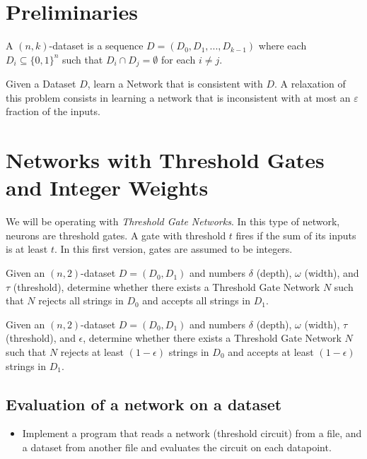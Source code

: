 \section{Preliminaries}


\begin{definition}[Dataset]
A $(n,k)$-dataset is a sequence $D = (D_0,D_1,...,D_{k-1})$ 
where each $D_i\subseteq \{0,1\}^n$ such that 
$D_i\cap D_j = \emptyset$ for each $i\neq j$.  
\end{definition}


\begin{problem}\label{Problem:MainProblem}
Given a Dataset $D$, learn a Network that is consistent with $D$. A relaxation of this problem consists in learning a network that is inconsistent with at most an $\varepsilon$ fraction of  the inputs. 
\end{problem}


\section{Networks with Threshold Gates and Integer Weights}

We will be operating with \textit{Threshold Gate Networks}. In this type of network, neurons are threshold gates. A gate with threshold $t$ fires if the sum of its inputs is at least $t$. In this first version, gates are assumed to be integers.  


\begin{problem}
\label{problem:Consistent}
Given an $(n,2)$-dataset $D = (D_0,D_1)$ and numbers 
$\delta$ (depth), $\omega$ (width), and $\tau$ (threshold), determine 
whether there exists a Threshold Gate Network $N$ 
such that $N$ rejects all strings in $D_0$ and accepts all 
strings in $D_1$. 
\end{problem}


\begin{problem}
\label{problem:Approximate}

Given an $(n,2)$-dataset $D = (D_0,D_1)$ and numbers 
$\delta$ (depth), $\omega$ (width), $\tau$ (threshold), and $\epsilon$, determine 
whether there exists a Threshold Gate Network $N$ 
such that $N$ rejects at least $(1-\epsilon)$ strings in $D_0$ and accepts at least $(1-\epsilon)$ strings in $D_1$. 
\end{problem}


\subsection{Evaluation of a network on a dataset}

\begin{itemize}
    \item Implement a program that reads a network (threshold circuit) from a file, and a dataset from another file and evaluates the circuit on each datapoint. 
\end{itemize}
